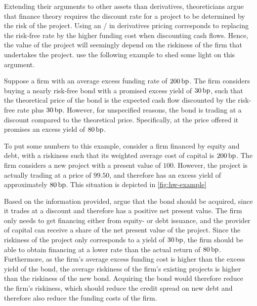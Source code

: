 \documentclass[main.tex]{subfiles}
\begin{document}
            Extending their arguments to other assets than derivatives, 
            theoreticians argue that finance theory requires the discount rate for a project 
            to be determined by the risk of the project.
            Using an \FVA/ in derivatives pricing corresponds to replacing the risk-free rate by the higher funding cost
            when discounting cash flows.
            Hence, the value of the project will seemingly depend on the riskiness of the firm that undertakes the project.
            \textcite{HullWhite2012FVA} use the following example to shed some light on this argument.

            \begin{example}
            Suppose a firm with an average excess funding rate of $200\,\text{bp}$. 
            The firm considers buying a nearly risk-free bond with a promised excess yield of $30\,\text{bp}$,
            such that the theoretical price of the bond is the expected cash flow 
            discounted by the risk-free rate plus $30\,\text{bp}$.
            However, for unspecified reasons, the bond is trading at a discount compared to the theoretical price.
            Specifically, at the price offered it promises an excess yield of $80\,\text{bp}$.
            
            To put some numbers to this example,
            consider a firm financed by equity and debt, 
            with a riskiness such that its weighted average cost of capital is $200\,\text{bp}$.
            The firm considers a new project with a present value of $100$.
            However, the project is actually trading at a price of $99.50$,
            and therefore has an excess yield of approximately $80\,\text{bp}$.
            This situation is depicted in \cref{fig:hw-example}

            Based on the information provided, \textcite{HullWhite2012FVA} argue that the bond should be acquired,
            since it trades at a discount and therefore has a positive net present value.
            The firm only needs to get financing either from equity- or debt issuance,
            and the provider of capital can receive a share of the net present value of the project.
            Since the riskiness of the project only corresponds to a yield of $30\,\text{bp}$,
            the firm should be able to obtain financing at a lower rate 
            than the actual return of $80\,\text{bp}$.
            Furthermore, as the firm's average excess funding cost is higher than the excess yield of the bond, 
            the average riskiness of the firm's existing projects is higher than the riskiness of the new bond.
            Acquiring the bond would therefore reduce the firm's riskiness,
            which should reduce the credit spread on new debt and therefore also reduce the funding costs of the firm.
            \end{example}
\end{document}
